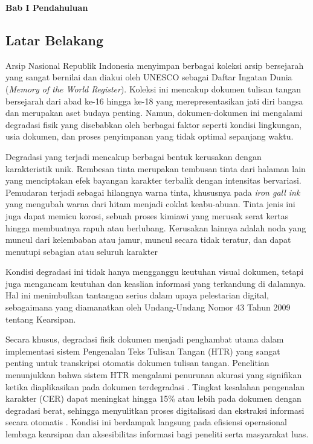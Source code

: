 

\vspace{2cm}
\begin{center}
      {\fontsize{14}{16.8}\selectfont\textbf{Bab I \quad Pendahuluan}}
\end{center}
\label{sec:pendahuluan}
\setcounter{section}{1}
\setcounter{subsection}{0}
\subsection{Latar Belakang}
\label{subsec:latar-belakang}

Arsip Nasional Republik Indonesia menyimpan berbagai koleksi arsip bersejarah yang sangat bernilai dan diakui oleh UNESCO sebagai Daftar Ingatan Dunia (\textit{Memory of the World Register}). Koleksi ini mencakup dokumen tulisan tangan bersejarah dari abad ke-16 hingga ke-18 yang merepresentasikan jati diri bangsa dan merupakan aset budaya penting. Namun, dokumen-dokumen ini mengalami degradasi fisik yang disebabkan oleh berbagai faktor seperti kondisi lingkungan, usia dokumen, dan proses penyimpanan yang tidak optimal sepanjang waktu.



Degradasi yang terjadi mencakup berbagai bentuk kerusakan dengan karakteristik unik. Rembesan tinta merupakan tembusan tinta dari halaman lain yang menciptakan efek bayangan karakter terbalik dengan intensitas bervariasi. Pemudaran terjadi sebagai hilangnya warna tinta, khususnya pada \textit{iron gall ink} yang mengubah warna dari hitam menjadi coklat keabu-abuan. Tinta jenis ini juga dapat memicu korosi, sebuah proses kimiawi yang merusak serat kertas hingga membuatnya rapuh atau berlubang. Kerusakan lainnya adalah noda yang muncul dari kelembaban atau jamur, muncul secara tidak teratur, dan dapat menutupi sebagian atau seluruh karakter


Kondisi degradasi ini tidak hanya mengganggu keutuhan visual dokumen, tetapi juga mengancam keutuhan dan keaslian informasi yang terkandung di dalamnya. Hal ini menimbulkan tantangan serius dalam upaya pelestarian digital, sebagaimana yang diamanatkan oleh Undang-Undang Nomor 43 Tahun 2009 tentang Kearsipan.


Secara khusus, degradasi fisik dokumen menjadi penghambat utama dalam implementasi sistem Pengenalan Teks Tulisan Tangan (HTR) yang sangat penting untuk transkripsi otomatis dokumen tulisan tangan. Penelitian menunjukkan bahwa sistem HTR mengalami penurunan akurasi yang signifikan ketika diaplikasikan pada dokumen terdegradasi \parencite{gatos2006}. Tingkat kesalahan pengenalan karakter (CER) dapat meningkat hingga 15\% atau lebih pada dokumen dengan degradasi berat, sehingga menyulitkan proses digitalisasi dan ekstraksi informasi secara otomatis \parencite{jadhav2022}. Kondisi ini berdampak langsung pada efisiensi operasional lembaga kearsipan dan aksesibilitas informasi bagi peneliti serta masyarakat luas.


